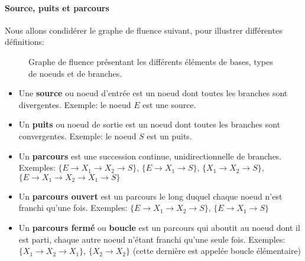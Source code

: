 \paragraph{Source, puits et parcours}
Nous allons condidérer le graphe de fluence suivant, pour illustrer différentes définitions: 

\begin{figure}[!h]
\begin{center}
\end{center}
    \caption{Graphe de fluence présentant les différents éléments de bases, types de noeuds et de branches.}
\end{figure}

\begin{itemize}
    \item Une \textbf{source} ou noeud d'entrée est un noeud dont 
        toutes les branches sont divergentes. Exemple: le noeud $E$ est une source.
    \item Un \textbf{puits} ou noeud de sortie est un noeud dont toutes 
    les branches sont convergentes. Exemple: le noeud $S$ est un puits.
    \item Un \textbf{parcours} est une succession continue, 
    unidirectionnelle de branches. Exemples: $\{E\rightarrow X_1\rightarrow X_2\rightarrow S\}$, 
    $\{E\rightarrow X_1\rightarrow S\}$, $\{X_1\rightarrow X_2\rightarrow S\}$, $\{E\rightarrow X_1\rightarrow X_2\rightarrow X_1\rightarrow S\}$

    \item Un \textbf{parcours ouvert} est un parcours le long duquel chaque 
          noeud n'est franchi qu'une fois. Exemples: $\{E\rightarrow X_1\rightarrow X_2\rightarrow S\}$, $\{E\rightarrow X_1 \rightarrow S\}$
    \item Un \textbf{parcours fermé} ou \textbf{boucle} est un parcours qui 
        aboutit au noeud dont il est parti, chaque autre noeud n'étant franchi qu'une seule fois. 
        Exemples: $\{X_1\rightarrow X_2\rightarrow X_1\}$, $\{X_2\rightarrow X_2\}$ (cette dernière est appelée boucle élémentaire)
\end{itemize}

